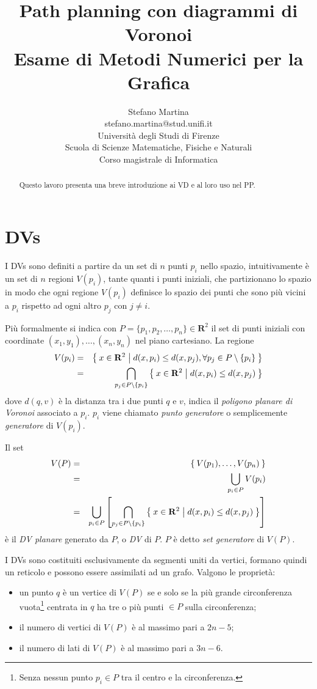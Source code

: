 \documentclass[a4paper,oneside]{article}
\author{
  {\Large Stefano Martina}\\
  {\small stefano.martina@stud.unifi.it}\\
  Universit\`a degli Studi di Firenze\\
  Scuola di Scienze Matematiche, Fisiche e Naturali\\
  Corso magistrale di Informatica
}
\title{{\Huge\bfseries Path planning con diagrammi di Voronoi}\\{\large\bfseries
    Esame di Metodi Numerici per la Grafica}}
\newcommand{\mr}{\ensuremath{\mathbf{R}}}
\begin{document}
\maketitle
\thispagestyle{empty}
\vfill
\begin{abstract}
  Questo lavoro presenta una breve introduzione ai \acf{VD} e al loro
  uso nel \acf{PP}.
\end{abstract}
\clearpage
\acresetall

\section*{\aclp{DV}}
I \acfp{DV} sono definiti a partire da un set di $n$ punti $p_i$ nello spazio,
intuitivamente \`e un set di $n$ regioni $V(p_i)$, tante quanti i punti
iniziali, che partizionano lo spazio in
modo che ogni regione $V(p_i)$ definisce lo spazio dei punti che sono
pi\`u vicini a $p_i$ rispetto ad ogni altro $p_j$ con $j\ne i$.

Pi\`u formalmente si indica con $P=\{p_1,p_2,\dots,p_n\}\in\mr^2$ il
set di punti iniziali con coordinate $(x_1, y_1),\dots,(x_n,y_n)$ nel
piano cartesiano. La regione
\begin{eqnarray*}
  V(p_i) &=& \Set{ x\in\mr^2 | d(x,p_i)\le d(x,p_j), \forall p_j\in
    P\setminus\{p_i\}} \\
  &=& \bigcap_{p_j\in P\setminus\{p_i\}}\Set{ x\in\mr^2 | d(x,p_i)\le d(x,p_j)}
\end{eqnarray*}
dove $d(q,v)$ \`e la distanza tra i due punti $q$ e $v$,
indica il \emph{poligono planare di Voronoi} associato a $p_i$. $p_i$
viene chiamato \emph{punto generatore} o semplicemente
\emph{generatore} di $V(p_i)$.

Il set
\begin{eqnarray*}
 V(P) &=& \Set{ V(p_1),\dots,V(p_n)}\\
 &=&\bigcup_{p_i\in P}V(p_i)\\
 &=&\bigcup_{p_i\in P}\left[\bigcap_{p_j\in P\setminus\{p_i\}}\Set{ x\in\mr^2 | d(x,p_i)\le d(x,p_j)}\right]
\end{eqnarray*}
\`e il \emph{\acl{DV} planare} generato da $P$, o
\emph{\acl{DV}}
di $P$. $P$ \`e detto \emph{set generatore} di $V(P)$.

I \acp{DV} sono costituiti esclusivamente da segmenti uniti da
vertici, formano quindi un reticolo e possono essere assimilati ad un
grafo. Valgono le propriet\`a:
\begin{itemize}
\item un punto $q$ \`e un vertice di $V(P)$ se e solo se la pi\`u grande
  circonferenza vuota\footnote{Senza nessun punto $p_i\in P$ tra il
    centro e la circonferenza.} centrata in $q$ ha tre o pi\`u punti
  $\in P$ sulla circonferenza;
\item il numero di vertici di $V(P)$ \`e al massimo pari a $2n-5$;
\item il numero di lati di $V(P)$ \`e al massimo pari a $3n-6$.
\end{itemize}
\end{document}
